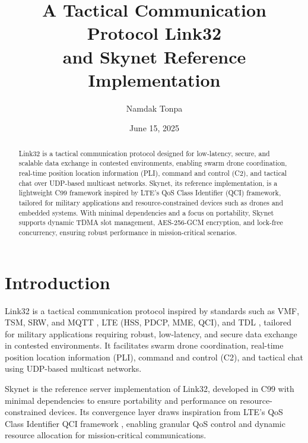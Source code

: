 \documentclass{article}
\begin{document}
\title{A Tactical Communication Protocol Link32 \\ and Skynet Reference Implementation}
\author{Namdak Tonpa}
\date{June 15, 2025}
\maketitle

\begin{abstract}
Link32 is a tactical communication protocol designed for low-latency, secure, and scalable data
exchange in contested environments, enabling swarm drone coordination, real-time position location
information (PLI), command and control (C2), and tactical chat over UDP-based multicast networks.
Skynet, its reference implementation, is a lightweight C99 framework inspired by LTE’s QoS Class
Identifier (QCI) framework, tailored for military applications and resource-constrained devices
such as drones and embedded systems. With minimal dependencies and a focus on portability, Skynet
supports dynamic TDMA slot management, AES-256-GCM encryption, and lock-free concurrency, ensuring
robust performance in mission-critical scenarios.
\end{abstract}

\newpage
\tableofcontents

\newpage
\section{Introduction}
Link32 is a tactical communication protocol inspired by standards such as VMF, TSM, SRW, and
MQTT \cite{mqtt5}, LTE (HSS, PDCP, MME, QCI), and TDL \cite{tdl}, tailored for military
applications requiring robust, low-latency, and secure data exchange in contested environments.
It facilitates swarm drone coordination, real-time position location information (PLI),
command and control (C2), and tactical chat using UDP-based multicast networks.

Skynet is the reference server implementation of Link32, developed in C99 with minimal dependencies
to ensure portability and performance on resource-constrained devices. Its convergence layer draws
inspiration from LTE’s QoS Class Identifier QCI framework \cite{3gpp}, enabling granular QoS control and
dynamic resource allocation for mission-critical communications.
\end{document}
